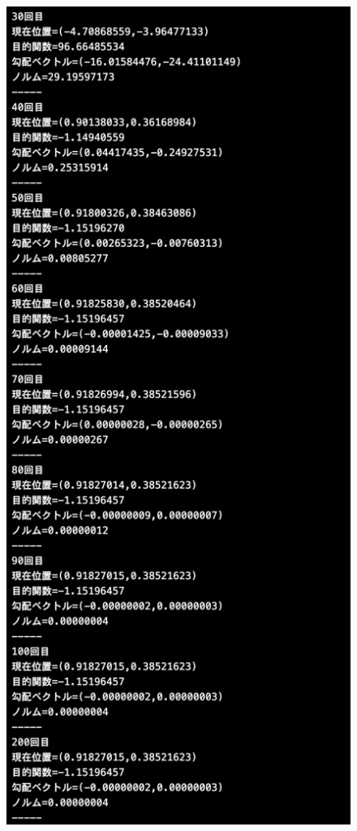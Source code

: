\documentclass[12pt]{jarticle}
\begin{document}
\begin{figure}[h]
\begin{minipage}{0.5\hsize}
\begin{center}
            \includegraphics[scale=0.2]{kadai1_1s_out1_2_2.png}
        \end{center}
    \end{minipage}
    \begin{minipage}{0.5\hsize}

\end{minipage}
\end{figure}
\end{document}
